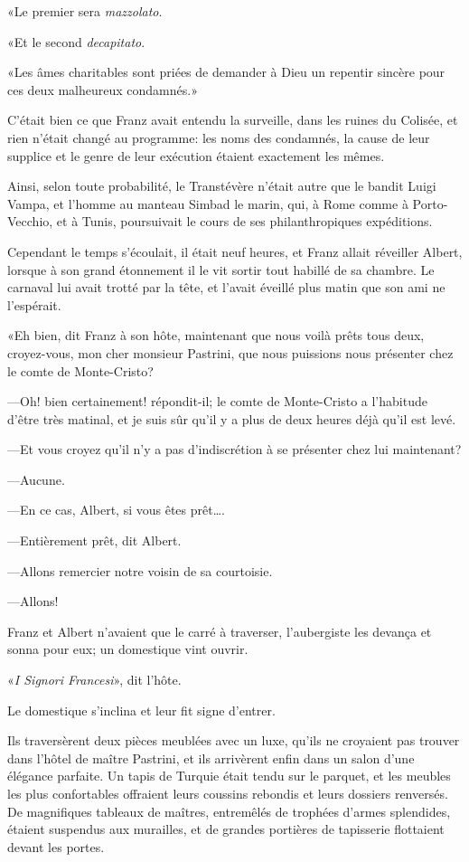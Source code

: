 «Le premier sera \textit{mazzolato}. 

«Et le second \textit{decapitato}. 

«Les âmes charitables sont priées de demander à Dieu un repentir sincère pour ces deux malheureux condamnés.»  

C'était bien ce que Franz avait entendu la surveille, dans les ruines du Colisée, et rien n'était changé au programme: les noms des condamnés, la cause de leur supplice et le genre de leur exécution étaient exactement les mêmes. 

Ainsi, selon toute probabilité, le Transtévère n'était autre que le bandit Luigi Vampa, et l'homme au manteau Simbad le marin, qui, à Rome comme à Porto-Vecchio, et à Tunis, poursuivait le cours de ses philanthropiques expéditions. 

Cependant le temps s'écoulait, il était neuf heures, et Franz allait réveiller Albert, lorsque à son grand étonnement il le vit sortir tout habillé de sa chambre. Le carnaval lui avait trotté par la tête, et l'avait éveillé plus matin que son ami ne l'espérait. 

«Eh bien, dit Franz à son hôte, maintenant que nous voilà prêts tous deux, croyez-vous, mon cher monsieur Pastrini, que nous puissions nous présenter chez le comte de Monte-Cristo? 

—Oh! bien certainement! répondit-il; le comte de Monte-Cristo a l'habitude d'être très matinal, et je suis sûr qu'il y a plus de deux heures déjà qu'il est levé. 

—Et vous croyez qu'il n'y a pas d'indiscrétion à se présenter chez lui maintenant? 

—Aucune.  

—En ce cas, Albert, si vous êtes prêt\dots. 

—Entièrement prêt, dit Albert. 

—Allons remercier notre voisin de sa courtoisie. 

—Allons! 

Franz et Albert n'avaient que le carré à traverser, l'aubergiste les devança et sonna pour eux; un domestique vint ouvrir. 

«\textit{I Signori Francesi}», dit l'hôte. 

Le domestique s'inclina et leur fit signe d'entrer.  

Ils traversèrent deux pièces meublées avec un luxe, qu'ils ne croyaient pas trouver dans l'hôtel de maître Pastrini, et ils arrivèrent enfin dans un salon d'une élégance parfaite. Un tapis de Turquie était tendu sur le parquet, et les meubles les plus confortables offraient leurs coussins rebondis et leurs dossiers renversés. De magnifiques tableaux de maîtres, entremêlés de trophées d'armes splendides, étaient suspendus aux murailles, et de grandes portières de tapisserie flottaient devant les portes. 

